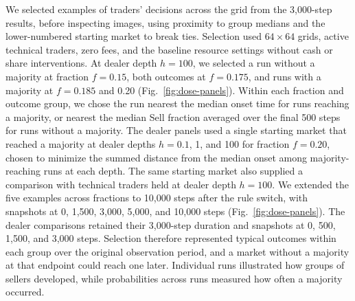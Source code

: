 We selected examples of traders' decisions across the grid from the
3,000-step results, before inspecting images, using proximity to group
medians and the lower-numbered starting market to break ties. Selection used
$64\times64$ grids, active technical traders, zero fees,
and the baseline resource settings without cash or share interventions.
At dealer depth $h=100$, we selected a run without a majority at
fraction $f=0.15$, both outcomes at $f=0.175$, and runs with a majority
at $f=0.185$ and 0.20 (Fig.~\ref{fig:dose-panels}). Within each fraction
and outcome group, we chose the run nearest the median onset time for
runs reaching a majority, or nearest the median Sell fraction averaged
over the final 500 steps for runs without a majority. The dealer panels
used a single starting market that reached a majority at dealer depths
$h=0.1$, 1, and 100 for fraction $f=0.20$, chosen to minimize the summed
distance from the median onset among majority-reaching runs at each
depth. The same starting
market also supplied a comparison with technical traders held at dealer
depth $h=100$. We extended the
five examples across fractions to 10,000 steps after the rule switch,
with snapshots at 0, 1,500, 3,000, 5,000, and 10,000 steps
(Fig.~\ref{fig:dose-panels}). The dealer comparisons retained their
3,000-step duration and snapshots at 0, 500, 1,500, and 3,000 steps.
Selection therefore represented typical outcomes within each group over
the original observation period, and a market without a majority at that
endpoint could reach one later. Individual runs illustrated how groups
of sellers developed, while probabilities across runs measured how
often a majority occurred.
